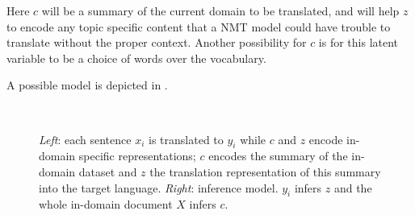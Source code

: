 Here $c$ will be a summary of the current domain to be translated,
and will help $z$ to encode any topic specific content that a NMT
model could have trouble to translate without the proper context.
Another possibility for $c$ is for this latent variable to be a
choice of words over the vocabulary.

A possible model is depicted in .

\begin{figure}[t]
    \centering
    ~

    \caption{{\it Left}: each sentence $x_i$ is translated to $y_i$
        while $c$ and $z$ encode in-domain specific representations; $c$
        encodes the summary of the in-domain dataset and $z$ the
        translation representation of this summary into the target
        language.
            {\it Right}: inference model. $y_i$ infers $z$ and the whole
        in-domain document $X$ infers $c$.}
    \label{fig:indomainstatistician}
\end{figure}


